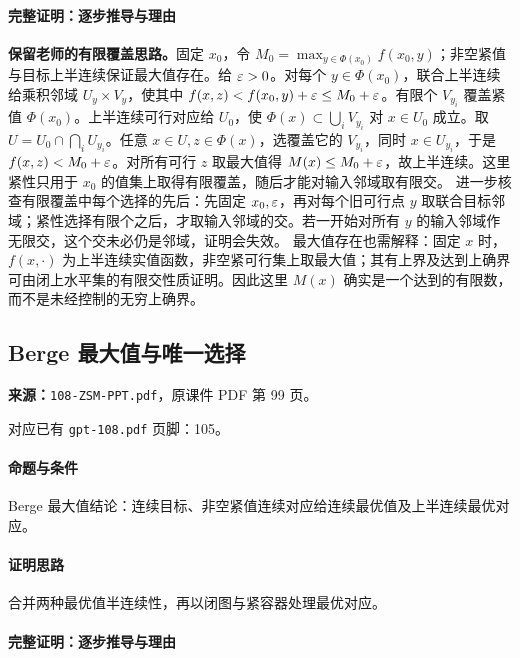 \paragraph{完整证明：逐步推导与理由}
\textbf{保留老师的有限覆盖思路。}固定 $x_0$，令 $M_0=\max_{y\in\Phi(x_0)}f(x_0,y)$；非空紧值与目标上半连续保证最大值存在。给 $\varepsilon>0$。对每个 $y\in\Phi(x_0)$，联合上半连续给乘积邻域 $U_y\times V_y$，使其中 $f(x,z)<f(x_0,y)+\varepsilon\le M_0+\varepsilon$。有限个 $V_{y_i}$ 覆盖紧值 $\Phi(x_0)$。上半连续可行对应给 $U_0$，使 $\Phi(x)\subset\bigcup_iV_{y_i}$ 对 $x\in U_0$ 成立。取 $U=U_0\cap\bigcap_iU_{y_i}$。任意 $x\in U,z\in\Phi(x)$，选覆盖它的 $V_{y_i}$，同时 $x\in U_{y_i}$，于是 $f(x,z)<M_0+\varepsilon$。对所有可行 $z$ 取最大值得 $M(x)\le M_0+\varepsilon$，故上半连续。这里紧性只用于 $x_0$ 的值集上取得有限覆盖，随后才能对输入邻域取有限交。
进一步核查有限覆盖中每个选择的先后：先固定 $x_0,\varepsilon$，再对每个旧可行点 $y$ 取联合目标邻域；紧性选择有限个之后，才取输入邻域的交。若一开始对所有 $y$ 的输入邻域作无限交，这个交未必仍是邻域，证明会失效。
最大值存在也需解释：固定 $x$ 时，$f(x,\cdot)$ 为上半连续实值函数，非空紧可行集上取最大值；其有上界及达到上确界可由闭上水平集的有限交性质证明。因此这里 $M(x)$ 确实是一个达到的有限数，而不是未经控制的无穷上确界。

\clearpage\subsection{Berge 最大值与唯一选择}
\textbf{来源：}\texttt{108-ZSM-PPT.pdf}，原课件 PDF 第 99 页。\par
对应已有 \texttt{gpt-108.pdf} 页脚：105。\par
\paragraph{命题与条件}Berge 最大值结论：连续目标、非空紧值连续对应给连续最优值及上半连续最优对应。
\paragraph{证明思路}合并两种最优值半连续性，再以闭图与紧容器处理最优对应。
\paragraph{完整证明：逐步推导与理由}

